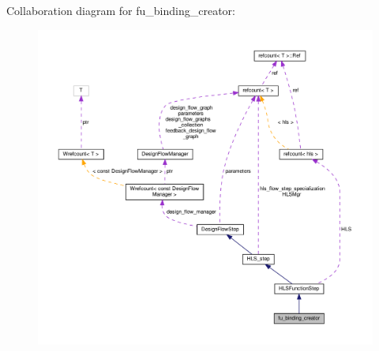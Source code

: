 Collaboration diagram for fu\+\_\+binding\+\_\+creator\+:
\nopagebreak
\begin{figure}[H]
\begin{center}
\leavevmode
\includegraphics[width=350pt]{d0/d90/classfu__binding__creator__coll__graph}
\end{center}
\end{figure}
